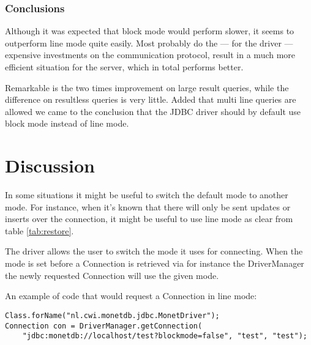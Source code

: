 \documentclass{article}
\begin{document}
\subsubsection{Conclusions}

Although it was expected that block mode would perform slower, it
seems to outperform line mode quite easily. Most probably do the ---
for the driver --- expensive investments on the communication
protocol, result in a much more efficient situation for the server, which
in total performs better.

Remarkable is the two times improvement on large result queries, while
the difference on resultless queries is very little. Added that multi line
queries are allowed we came to the conclusion that the JDBC driver
should by default use block mode instead of line mode.


\section{Discussion}

In some situations it might be useful to switch the default mode to
another mode. For instance, when it's known that there will only be
sent updates or inserts over the connection, it might be useful to
use line mode as clear from table \ref{tab:restore}.

The driver allows the user to switch the mode it uses for connecting.
When the mode is set before a \textsf{Connection} is retrieved via
for instance the \textsf{DriverManager} the newly requested
\textsf{Connection} will use the given mode.

An example of code that would request a \textsf{Connection} in line
mode:
\begin{verbatim}
Class.forName("nl.cwi.monetdb.jdbc.MonetDriver");
Connection con = DriverManager.getConnection(
 	"jdbc:monetdb://localhost/test?blockmode=false", "test", "test");
\end{verbatim}
\end{document}

